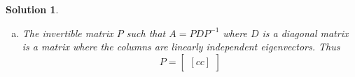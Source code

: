 \documentclass[11pt]{scrartcl}
\theoremstyle{dotlessP}
\newtheorem{sol}{Solution}[section]
\theoremstyle{dotlessN}
\newcommand{\lra}{\leftrightarrow}
\begin{document}
\begin{sol}
\begin{enumerate}[(a)]
			We do the same for $\lambda = -\frac{1}{\phi}$.
			\begin{align*}
				\begin{bmatrix}[cc|c]
					1 + \frac{1}{\phi} & 1 & 0 \\
					1 & \frac{1}{\phi} & 0
				\end{bmatrix}
				\begin{array}{c}
					R_1 \lra R_2 \\
					\sim
				\end{array}
				\begin{bmatrix}[cc|c]
					1 & \frac{1}{\phi} & 0 \\
					1 + \frac{1}{\phi} & 1 & 0 
				\end{bmatrix} \\
				\begin{array}{c}
					R_2 - (1 + \frac{1}{\phi})R_1 \to R_2
					\sim
				\end{array}
				\begin{bmatrix}[cc|c]
					1 & \frac{1}{\phi} & 0 \\
					0 & 1 - \frac{1}{\phi} - \frac{1}{\phi^2} & 0 
				\end{bmatrix} \\
			\end{align*}
			As $-\frac{1}{\phi} = \frac{1-\sqrt{5}}{2}$, it follows that $\frac{1}{\phi} = \frac{\sqrt{5} - 1}{2}$, so we substitute to get
						\[
				\begin{bmatrix}[cc|c]
					1 & \frac{\sqrt{5} -1}{2} &0 \\
					0 & 0 & 0
			\end{bmatrix}
			\] 
						Thus, we have the general solution
			\[
				\bm{x} = x_2 
				\begin{bmatrix}[c]
				\frac{1 -\sqrt{5}}{2} \\
				1
			\end{bmatrix}		
			\] 
			and thus the eigenvector corresponding to $-1/\phi$ is $
			\begin{bmatrix}[c]
	\frac{1 - \sqrt{5}}{2} \\
	1
\end{bmatrix} = 
\begin{bmatrix}
	-\frac{1}{phi} \\
	1
\end{bmatrix}
$
.
		\item The invertible matrix $P$ such that $A = PDP^{-1}$ where $D$ is a diagonal matrix is a matrix where the columns are linearly independent eigenvectors. Thus
			\[
			P = 
			\begin{bmatrix}[cc]

\end{bmatrix}\]
\end{enumerate}
\end{sol}
\end{document}
